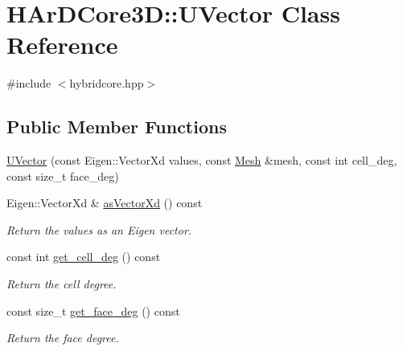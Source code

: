 \hypertarget{classHArDCore3D_1_1UVector}{}\section{H\+Ar\+D\+Core3D\+:\+:U\+Vector Class Reference}
\label{classHArDCore3D_1_1UVector}


{\ttfamily \#include $<$hybridcore.\+hpp$>$}

\subsection*{Public Member Functions}
\begin{DoxyCompactItemize}
\item 
\hyperlink{classHArDCore3D_1_1UVector_ae2a9aa60d46161d5cbba31dfd1c5eccd}{U\+Vector} (const Eigen\+::\+Vector\+Xd values, const \hyperlink{classHArDCore3D_1_1Mesh}{Mesh} \&mesh, const int cell\+\_\+deg, const size\+\_\+t face\+\_\+deg)
\item 
\mbox{\label{classHArDCore3D_1_1UVector_ac44c85c6f56c0c6f2b66f0ed630574dd}} 
Eigen\+::\+Vector\+Xd \& \hyperlink{classHArDCore3D_1_1UVector_ac44c85c6f56c0c6f2b66f0ed630574dd}{as\+Vector\+Xd} () const
\begin{DoxyCompactList}\small\item\em Return the values as an Eigen vector. \end{DoxyCompactList}\item 
\mbox{\label{classHArDCore3D_1_1UVector_a4621feb28406aad90512e4a0b6ec5662}} 
const int \hyperlink{classHArDCore3D_1_1UVector_a4621feb28406aad90512e4a0b6ec5662}{get\+\_\+cell\+\_\+deg} () const
\begin{DoxyCompactList}\small\item\em Return the cell degree. \end{DoxyCompactList}\item 
\mbox{\label{classHArDCore3D_1_1UVector_a8f9826e319a633d697fb7fe50ffa2799}} 
const size\+\_\+t \hyperlink{classHArDCore3D_1_1UVector_a8f9826e319a633d697fb7fe50ffa2799}{get\+\_\+face\+\_\+deg} () const
\begin{DoxyCompactList}\small\item\em Return the face degree. \end{DoxyCompactList}\item 

\end{DoxyCompactItemize}
